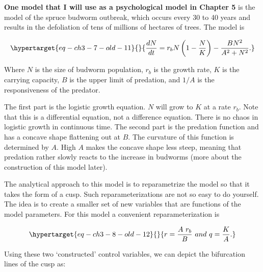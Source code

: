 \documentclass[
  letterpaper,
]{scrbook}
\begin{document}
\textbf{One model that I will use as a psychological model in Chapter 5}
is the model of the spruce budworm outbreak, which occurs every 30 to 40
years and results in the defoliation of tens of millions of hectares of
trees. The model is

\begin{equation}\protect\hypertarget{eq-ch3-7-old-11}{}{
\frac{dN}{dt} = r_{b}N\left( 1 - \frac{N}{K} \right) - \frac{BN^{2}}{A^{2} + N^{2}}.
}\label{eq-ch3-7-old-11}\end{equation}

Where \(N\) is the size of budworm population, \(r_{b}\) is the growth
rate, \(K\) is the carrying capacity, \(B\) is the upper limit of
predation, and \(1/A\) is the responsiveness of the predator.

The first part is the logistic growth equation. \(N\) will grow to \(K\)
at a rate \(r_{b}\). Note that this is a differential equation, not a
difference equation. There is no chaos in logistic growth in continuous
time. The second part is the predation function and has a concave shape
flattening out at \(B\). The curvature of this function is determined by
\(A\). High \(A\) makes the concave shape less steep, meaning that
predation rather slowly reacts to the increase in budworms (more about
the construction of this model later).

The analytical approach to this model is to reparametrize the model so
that it takes the form of a cusp. Such reparameterizations are not so
easy to do yourself. The idea is to create a smaller set of new
variables that are functions of the model parameters. For this model a
convenient reparameterization is

\begin{equation}\protect\hypertarget{eq-ch3-8-old-12}{}{
r = \frac{A\ r_{b}}{B}\ and\ q = \frac{K}{A}.
}\label{eq-ch3-8-old-12}\end{equation}

Using these two `constructed' control variables, we can depict the
bifurcation lines of the cusp as:
\end{document}

